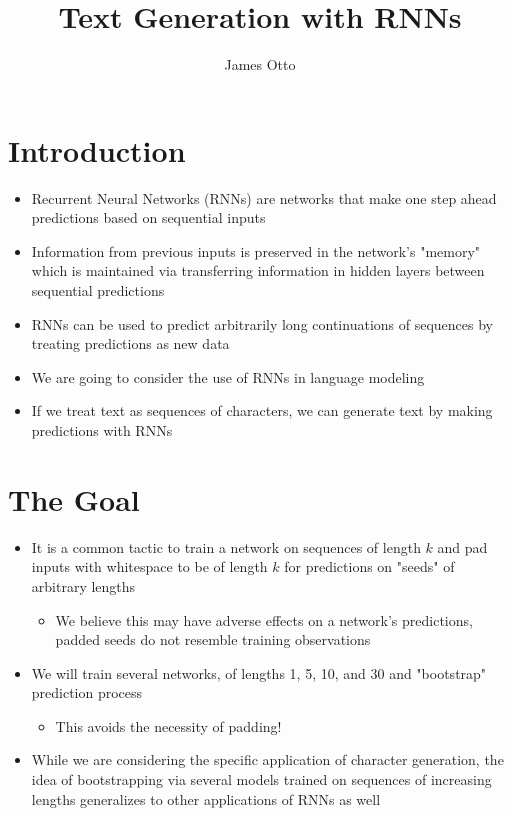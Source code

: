 \documentclass[t]{beamer}\usepackage[]{graphicx}\usepackage[]{color}
\begin{document}
\title[Application of RNNs to Text Generation]{Text Generation with RNNs}

\author{James Otto}

\frame{\titlepage}

\section{Introduction}
\begin{frame}
\begin{itemize}
  \item Recurrent Neural Networks (RNNs) are networks that make one step ahead predictions based on sequential inputs
  \item Information from previous inputs is preserved in the network's "memory" which is maintained via transferring information in hidden layers between sequential predictions
  \item RNNs can be used to predict arbitrarily long continuations of sequences by treating predictions as new data
\end{itemize}
\end{frame}

\begin{frame}
\begin{itemize}
  \item We are going to consider the use of RNNs in language modeling
  \item If we treat text as sequences of characters, we can generate text by making predictions with RNNs
\end{itemize}
\end{frame}

\section{The Goal}

\begin{frame}
\begin{itemize}
  \item It is a common tactic to train a network on sequences of length $k$ and pad
  inputs with whitespace to be of length $k$ for predictions on "seeds" of arbitrary lengths
  \begin{itemize}
    \item We believe this may have adverse effects on a network's predictions,
    padded seeds do not resemble training observations
  \end{itemize}
  \item We will train several networks, of lengths 1, 5, 10, and 30
  and "bootstrap" prediction process
  \begin{itemize}
    \item This avoids the necessity of padding!
  \end{itemize}
  \item While we are considering the specific application of character generation,
  the idea of bootstrapping via several models trained on sequences of increasing
  lengths generalizes to other applications of RNNs as well
\end{itemize}
\end{frame}
\end{document}
